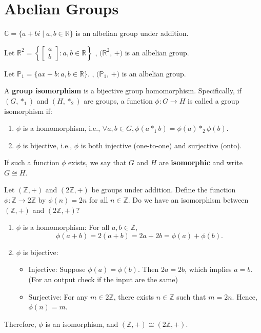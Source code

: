 \section{Abelian Groups}

\begin{eg}
    $\mathbb{C} = \{a + bi \mid a, b \in \mathbb{R}\}$ is an albelian group under addition.
\end{eg}

\begin{eg}
    Let $\mathbb{R}^2 = \left\{ \begin{bmatrix} a \\ b \end{bmatrix} : a, b \in \mathbb{R} \right\}$
    , $(\mathbb{R}^2$, $+)$ is an albelian group.
\end{eg}

\begin{eg}
    Let $\mathbb{P}_1 = \{ax + b : a, b \in \mathbb{R}\}$.
    , $(\mathbb{P}_1$, $+)$ is an albelian group.
\end{eg}

\begin{definition}
    A \textbf{group isomorphism} is a bijective group homomorphism. Specifically, if $(G, *_1)$ and $(H, *_2)$ are groups, a function $\phi: G \to H$ is called a group isomorphism if:
    \begin{enumerate}
        \item $\phi$ is a homomorphism, i.e., $\forall a, b \in G, \phi(a *_1 b) = \phi(a) *_2 \phi(b)$.
        \item $\phi$ is bijective, i.e., $\phi$ is both injective (one-to-one) and surjective (onto).
    \end{enumerate}
    If such a function $\phi$ exists, we say that $G$ and $H$ are \textbf{isomorphic} and write $G \cong H$.
\end{definition}
\begin{exercise}
    Let $(\mathbb{Z}, +)$ and $(2\mathbb{Z}, +)$ be groups under addition. Define the function $\phi: \mathbb{Z} \to 2\mathbb{Z}$ by $\phi(n) = 2n$ for all $n \in \mathbb{Z}$. 
    Do we have an isomorphism between $(\mathbb{Z}, +)$ and $(2\mathbb{Z}, +)$?
    \begin{enumerate}
        \item $\phi$ is a homomorphism: For all $a, b \in \mathbb{Z}$,
        \[
        \phi(a + b) = 2(a + b) = 2a + 2b = \phi(a) + \phi(b).
        \]
        \item $\phi$ is bijective:
        \begin{itemize}
            \item Injective: Suppose $\phi(a) = \phi(b)$. Then $2a = 2b$, which implies $a = b$. (For an output check if the input are the same)
            \item Surjective: For any $m \in 2\mathbb{Z}$, there exists $n \in \mathbb{Z}$ such that $m = 2n$. Hence, $\phi(n) = m$.
        \end{itemize}
    \end{enumerate}
    Therefore, $\phi$ is an isomorphism, and $(\mathbb{Z}, +) \cong (2\mathbb{Z}, +)$.
\end{exercise}


